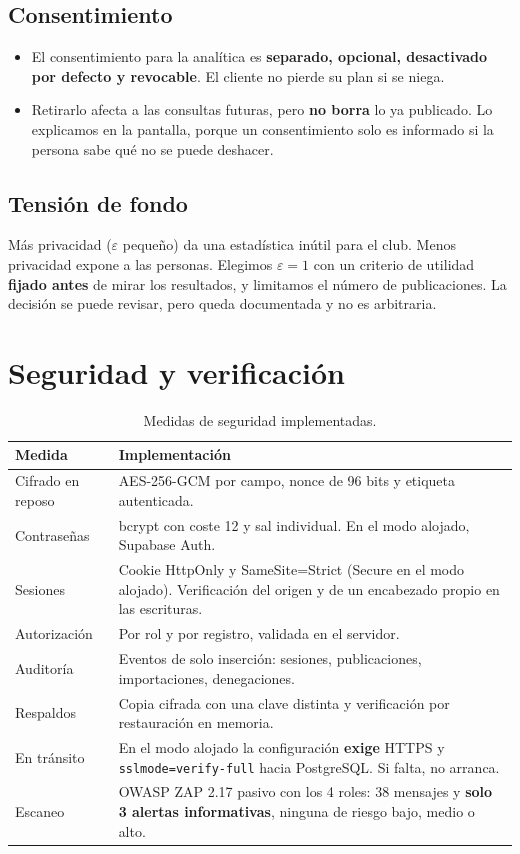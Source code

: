 \documentclass[11pt]{article}
\begin{document}
\subsection*{Consentimiento}
\begin{itemize}[nosep]
  \item El consentimiento para la analítica es \textbf{separado, opcional, desactivado por defecto y revocable}. El cliente no pierde su plan si se niega.
  \item Retirarlo afecta a las consultas futuras, pero \textbf{no borra} lo ya publicado. Lo explicamos en la pantalla, porque un consentimiento solo es informado si la persona sabe qué no se puede deshacer.
\end{itemize}

\subsection*{Tensión de fondo}
Más privacidad ($\varepsilon$ pequeño) da una estadística inútil para el club. Menos privacidad expone a las personas. Elegimos $\varepsilon = 1$ con un criterio de utilidad \textbf{fijado antes} de mirar los resultados, y limitamos el número de publicaciones. La decisión se puede revisar, pero queda documentada y no es arbitraria.

\section{Seguridad y verificación}

\begin{table}[H]
\centering\small
\begin{tabularx}{\textwidth}{@{}p{3cm}Y@{}}
\toprule
\textbf{Medida} & \textbf{Implementación} \\
\midrule
Cifrado en reposo & AES-256-GCM por campo, nonce de 96 bits y etiqueta autenticada. \\
Contraseñas & bcrypt con coste 12 y sal individual. En el modo alojado, Supabase Auth. \\
Sesiones & Cookie HttpOnly y SameSite=Strict (Secure en el modo alojado). Verificación del origen y de un encabezado propio en las escrituras. \\
Autorización & Por rol y por registro, validada en el servidor. \\
Auditoría & Eventos de solo inserción: sesiones, publicaciones, importaciones, denegaciones. \\
Respaldos & Copia cifrada con una clave distinta y verificación por restauración en memoria. \\
En tránsito & En el modo alojado la configuración \textbf{exige} HTTPS y \texttt{sslmode=verify-full} hacia PostgreSQL. Si falta, no arranca. \\
Escaneo & OWASP ZAP 2.17 pasivo con los 4 roles: 38 mensajes y \textbf{solo 3 alertas informativas}, ninguna de riesgo bajo, medio o alto. \\
\bottomrule
\end{tabularx}
\caption{Medidas de seguridad implementadas.}
\end{table}
\end{document}
